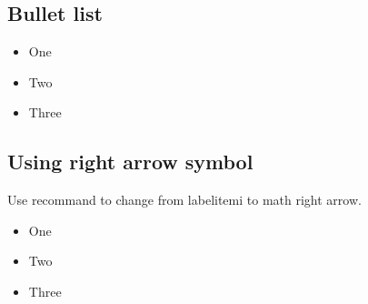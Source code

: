 \documentclass{proc}
\begin{document}
\subsection{Bullet list}

\begin{itemize}
	\item One
	\item Two
	\item Three
\end{itemize}

\subsection{Using right arrow symbol}

Use recommand to change from labelitemi to math right arrow.

\renewcommand{\labelitemi}{$\rightarrow$}
\begin{itemize}
	\item One
	\item Two
	\item Three
\end{itemize}
\end{document}
